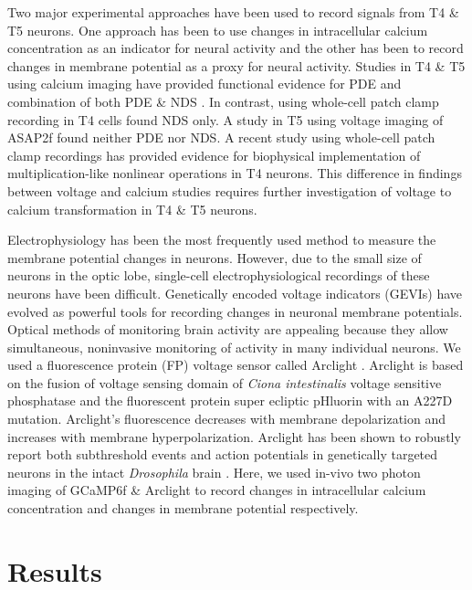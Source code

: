 \documentclass[9pt,lineno]{elife}
\begin{document}
Two major experimental approaches have been used to record signals from T4 \& T5 neurons. One approach has been to use changes in intracellular calcium concentration as an indicator for neural activity and the other has been to record changes in membrane potential as a proxy for neural activity. Studies in T4 \& T5 using calcium imaging have provided functional evidence for PDE \parencite{Fisher2015, Salazar-Gatzimas2016} and combination of both PDE \& NDS \parencite{Haag2016, Leong2016, Haag2017}. In contrast, \cite{Gruntman2018} using whole-cell patch clamp recording in T4 cells found NDS only. A study in T5 using voltage imaging of ASAP2f \parencite{Wienecke2018} found neither PDE nor NDS. A recent study using whole-cell patch clamp recordings \parencite{Groschner2022} has provided evidence for biophysical implementation of multiplication-like nonlinear operations in T4 neurons. This difference in findings between voltage and calcium studies requires further investigation of voltage to calcium transformation in T4 \& T5 neurons.

Electrophysiology has been the most frequently used method to measure the membrane potential changes in neurons. However, due to the small size of neurons in the optic lobe, single-cell electrophysiological recordings of these neurons have been difficult. Genetically encoded voltage indicators (GEVIs) have evolved as powerful tools for recording changes in neuronal membrane potentials. Optical methods of monitoring brain activity are appealing because they allow simultaneous, noninvasive monitoring of activity in many individual neurons. We used a fluorescence protein (FP) voltage sensor called Arclight \parencite{Jin2012}. Arclight is based on the fusion of voltage sensing domain of \textit{Ciona intestinalis} voltage sensitive phosphatase \parencite{Murata2005} and the fluorescent protein super ecliptic pHluorin with an A227D mutation. Arclight's fluorescence decreases with membrane depolarization and increases with membrane hyperpolarization. Arclight has been shown to robustly report both subthreshold events and action potentials in genetically targeted neurons in the intact \textit{Drosophila} brain \parencite{Cao2013}. Here, we used in-vivo two photon imaging of GCaMP6f \parencite{Chen2013} \& Arclight to record changes in intracellular calcium concentration and changes in membrane potential respectively.

\section{Results}
\end{document}
